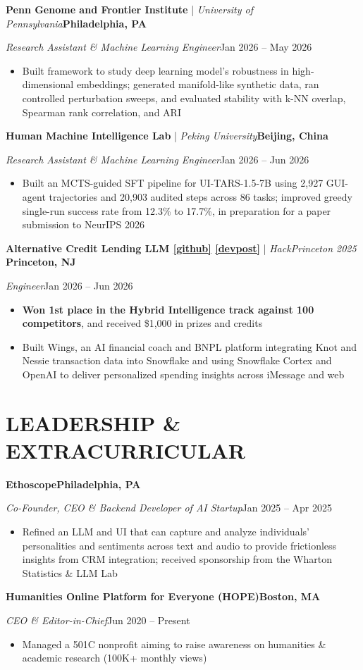 \documentclass[10pt,letterpaper]{article}
\newcommand{\ressection}[1]{\section*{#1}}
\newcommand{\resheading}[4]{%
    \textbf{#1}\hfill \textbf{#2}\par
    \textit{#3}\hfill #4\par
}
\begin{document}
\textbf{Penn Genome and Frontier Institute} \;|\; \textit{University of Pennsylvania}\hfill \textbf{Philadelphia, PA} \par
\textit{Research Assistant \& Machine Learning Engineer}\hfill Jan 2026 -- May 2026
\begin{itemize}
    \item Built framework to study deep learning model's robustness in high-dimensional embeddings; generated manifold-like synthetic data, ran controlled perturbation sweeps, and evaluated stability with k-NN overlap, Spearman rank correlation, and ARI
\end{itemize}
\vspace{1pt}
\textbf{Human Machine Intelligence Lab} \;|\; \textit{Peking University}\hfill \textbf{Beijing, China} \par
\textit{Research Assistant \& Machine Learning Engineer}\hfill Jan 2026 -- Jun 2026
\begin{itemize}
    \item Built an MCTS-guided SFT pipeline for UI-TARS-1.5-7B using 2,927 GUI-agent trajectories and 20,903 audited steps across 86 tasks; improved greedy single-run success rate from 12.3\% to 17.7\%, in preparation for a paper submission to NeurIPS 2026
\end{itemize}
\vspace{1pt}
\textbf{Alternative Credit Lending LLM \href{https://github.com/gowathena/hackprinceton2025a}{[github]} \href{https://lnkd.in/gkdR3p6Z}{[devpost]}} \;|\; \textit{HackPrinceton 2025} \hfill \textbf{Princeton, NJ} \par
\textit{Engineer}\hfill Jan 2026 -- Jun 2026
\begin{itemize}
     \item \textbf{Won 1st place in the Hybrid Intelligence track against 100 competitors}, and received \$1,000 in prizes and credits
    \item Built Wings, an AI financial coach and BNPL platform integrating Knot and Nessie transaction data into Snowflake and using Snowflake Cortex and OpenAI to deliver personalized spending insights across iMessage and web
\end{itemize}

\ressection{LEADERSHIP \& EXTRACURRICULAR}
\resheading{Ethoscope}{Philadelphia, PA}{Co-Founder, CEO \& Backend Developer of AI Startup}{Jan 2025 -- Apr 2025}
\begin{itemize}
    \item Refined an LLM and UI that can capture and analyze individuals' personalities and sentiments across text and audio to provide frictionless insights from CRM integration; received sponsorship from the Wharton Statistics \& LLM Lab
\end{itemize}
\vspace{1pt}
\resheading{Humanities Online Platform for Everyone (HOPE)}{Boston, MA}{CEO \& Editor-in-Chief}{Jun 2020 -- Present}
\begin{itemize}
    \item Managed a 501C nonprofit aiming to raise awareness on humanities \& academic research (100K+ monthly views)
\end{itemize}
\end{document}
